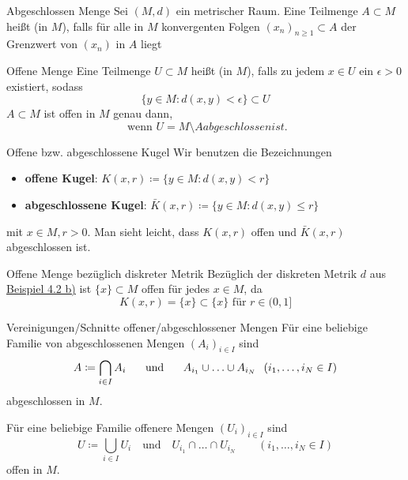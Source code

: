 	\begin{karte}{Abgeschlossen Menge}	
		Sei $(M, d)$ ein metrischer Raum. Eine Teilmenge $A \subset M$ hei{\ss}t  (in $M$), falls für alle in $M$ konvergenten Folgen $(x_{n})_{n \geq 1} \subset A$ der Grenzwert von $(x_{n})$ in $A$ liegt
	\end{karte}

	\begin{karte}{Offene Menge}	
		Eine Teilmenge $U \subset M$ hei{\ss}t  (in $M$), falls zu jedem $x \in U$ ein $\epsilon > 0$ existiert, sodass
			\[ \{ y \in M: d(x, y) < \epsilon \} \subset U \]
			$A \subset M$ ist offen in $M$ genau dann,
			\[ \text{ wenn } U = M \setminus A { abgeschlossen ist.} \]
	\end{karte}
	
	\begin{karte}{Offene bzw. abgeschlossene Kugel}		
		Wir benutzen die Bezeichnungen
			\begin{itemize}
				\item \textbf{offene Kugel}: $K(x, r)  \coloneqq \{ y \in M: d(x, y) < r \}$
				\item \textbf{abgeschlossene Kugel}: $\bar K(x, r) \coloneqq \{ y \in M: d(x, y) \leq r \}$
			\end{itemize}
			mit $x \in M, r > 0$. Man sieht leicht, dass $K(x, r)$ offen und $\bar K(x, r)$ abgeschlossen ist.
	\end{karte}
	
	\begin{karte}{Offene Menge bezüglich diskreter Metrik}
		Bezüglich der diskreten Metrik $d$ aus \hyperref[bsp:1-diskreteMetrik]{Beispiel 4.2 b)} ist $\{x\} \subset M$ offen für jedes $x \in M$, da
			\[ K(x, r) = \{ x \} \subset \{ x \} \text{ für } r \in (0, 1] \]	
	\end{karte}

	\begin{karte}{Vereinigungen/Schnitte offener/abgeschlossener Mengen}
		Für eine beliebige Familie von abgeschlossenen Mengen $(A_{i})_{i \in I}$ sind 
			\[ A \coloneqq \bigcap_{i \in I} A_{i} \hspace{0.5cm} \text{ und } \hspace{0.5cm} A_{i_{1}} \cup \dotsc \cup A_{i_{N}} \hspace{0.25cm} (i_{1}, \dotsc, i_{N} \in I) \]
			abgeschlossen in $M$.
			
		Für eine beliebige Familie offenere Mengen $(U_{i})_{i \in I}$ sind
			\[ U \coloneqq \bigcup_{i \in I} U_{i} \quad \text{und} \quad U_{i_{1}} \cap \dotsc \cap U_{i_{N}} \qquad (i_{1}, \dotsc, i_{N} \in I) \] 
			offen in $M$.
	\end{karte}
	
